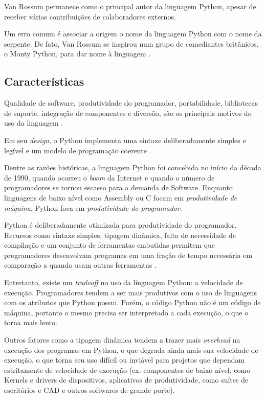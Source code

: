 Van Rossum permanece como o principal autor da linguagem Python, apesar de receber várias contribuições de colaboradores externos.

Um erro comum é associar a origem o nome da linguagem Python com o nome da serpente. De fato, Van Rossum se inspirou num grupo de comediantes britânicos, o Monty Python, para dar nome à linguagem \cite{pythonfaq} . %



\subsection{Características}
Qualidade de software, produtividade do programador, portabilidade, bibliotecas de suporte, integração de componentes e diversão, são os principais motivos do uso da linguagem \cite{learningpython}. %

Em seu \emph{design}, o Python implementa uma sintaxe deliberadamente simples e legível e um modelo de programação coerente \cite{learningpython}. %

Dentre as razões históricas, a linguagem Python foi concebida no início da década de 1990, quando ocorreu o \emph{boom} da Internet e quando o número de programadores se tornou escasso para a demanda de Software. Enquanto linguagens de baixo nível como Assembly ou C focam em \emph{produtividade de máquina}, Python foca em \emph{produtividade do programador}. 

Python é deliberadamente otimizada para produtividade do programador. Recursos como sintaxe simples, tipagem dinâmica, falta de necessidade de compilação e um conjunto de ferramentas embutidas permitem que programadores desenvolvam programas em uma fração de tempo necessária em comparação a quando usam outras ferramentas \cite{learningpython}. %

Entretanto, existe um \emph{tradeoff} no uso da linguagem Python: a velocidade de execução. Programadores tendem a ser mais produtivos com o uso de linguagens com os atributos que Python possui. Porém, o código Python não é um código de máquina, portanto o mesmo precisa ser interpretado a cada execução, o que o torna mais lento. 

Outros fatores como a tipagem dinâmica tendem a trazer mais \emph{overhead} na execução dos programas em Python, o que degrada ainda mais sua velocidade de execução, o que torna seu uso difícil ou inviável para projetos que dependam estritamente de velocidade de execução (ex: componentes de baixo nível, como Kernels e drivers de dispositivos, aplicativos de produtividade, como suítes de escritórios e CAD e outros softwares de grande porte).

